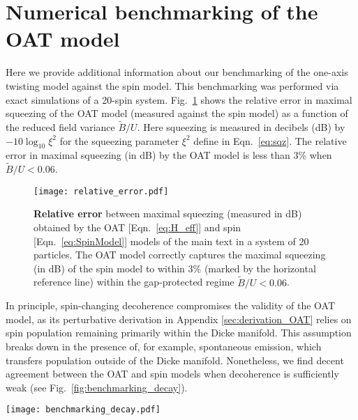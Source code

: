 \documentclass[aps,prx,superscriptaddress,notitlepage,twocolumn,longbibliography]{revtex4-2}
\begin{document}
\section{Numerical benchmarking of the OAT model}
\label{sec:benchmarking}
\setcounter{figure}{0}

Here we provide additional information about our benchmarking of the one-axis twisting model against the spin model.
This benchmarking was performed via exact simulations of a 20-spin system.
Fig.~\ref{fig:relative_error} shows the relative error in maximal squeezing of the OAT model (measured against the spin model) as a function of the reduced field variance $\widetilde{B}/U$.
Here squeezing is measured in decibels (dB) by $-10\log_{10}\xi^2$ for the squeezing parameter $\xi^2$ define in Eqn.~\eqref{eq:sqz}.
The relative error in maximal squeezing (in dB) by the OAT model is less than 3\% when $\widetilde{B}/U<0.06$.

\begin{figure}
\centering
\texttt{[image: relative\_error.pdf]}
\caption{{\bf Relative error} between maximal squeezing (measured in dB) obtained by the OAT [Eqn.~\eqref{eq:H_eff}] and spin [Eqn.~\eqref{eq:SpinModel}] models of the main text in a system of 20 particles.
The OAT model correctly captures the maximal squeezing (in dB) of the spin model to within 3\% (marked by the horizontal reference line) within the gap-protected regime $\widetilde{B}/U<0.06$.
}
\label{fig:relative_error}
\end{figure}

In principle, spin-changing decoherence compromises the validity of the OAT model, as its perturbative derivation in Appendix \ref{sec:derivation_OAT} relies on spin population remaining primarily within the Dicke manifold.
This assumption breaks down in the presence of, for example, spontaneous emission, which transfers population outside of the Dicke manifold.
Nonetheless, we find decent agreement between the OAT and spin models when decoherence is sufficiently weak (see Fig.~\ref{fig:benchmarking_decay}).

\begin{figure*}
\centering
\texttt{[image: benchmarking\_decay.pdf]}
\caption{{\bf Comparison between the OAT and the spin model in the presence of decoherence.}
({\bf a}) The difference between the maximal squeezing (measured in dB) obtained by the OAT [Eqn.~\eqref{eq:H_eff}] and spin [Eqn.~\eqref{eq:SpinModel}] models increases with the particle number $N$ and the single-particle spontaneous emission rate $\gamma$.
This disagreement is attributed in part to the fact that spontaneous emission transfers population of the collective spin state outside of the Dicke manifold, violating an assumption of the OAT model; see panel ({\bf b}).
The rate of population transfer outside of the Dicke manifold increases with both particle number and spontaneous emission rate.
(Parameters for simulations in this figure: $U=1000$ Hz, $J=200$ Hz, and $\phi=\pi/20$).
}
\label{fig:benchmarking_decay}
\end{figure*}
\end{document}
